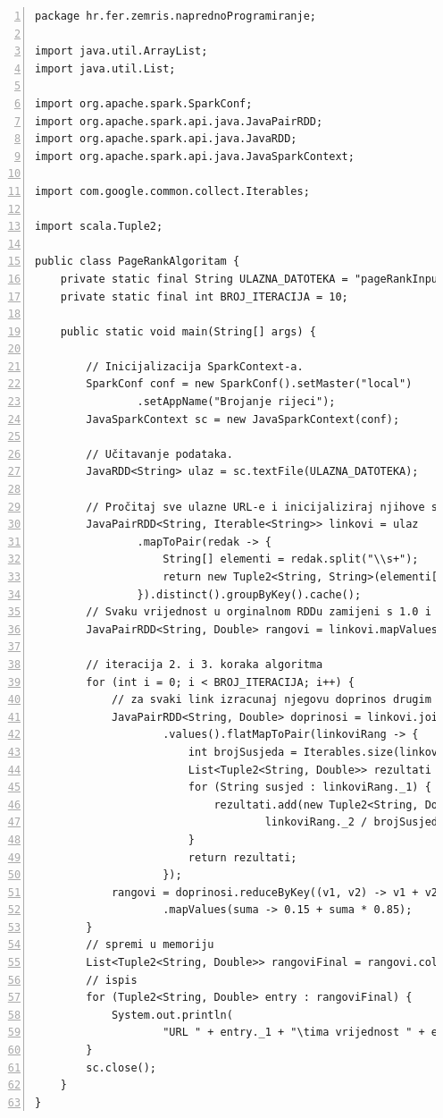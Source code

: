 \documentclass[times, utf8, zavrsni]{fer}
\begin{document}
\vspace{5mm}
\begin{lstlisting}[numbers=left, label={lst:pagerank}]
package hr.fer.zemris.naprednoProgramiranje;

import java.util.ArrayList;
import java.util.List;

import org.apache.spark.SparkConf;
import org.apache.spark.api.java.JavaPairRDD;
import org.apache.spark.api.java.JavaRDD;
import org.apache.spark.api.java.JavaSparkContext;

import com.google.common.collect.Iterables;

import scala.Tuple2;

public class PageRankAlgoritam {
	private static final String ULAZNA_DATOTEKA = "pageRankInput.txt";
	private static final int BROJ_ITERACIJA = 10;

	public static void main(String[] args) {

		// Inicijalizacija SparkContext-a.
		SparkConf conf = new SparkConf().setMaster("local")
				.setAppName("Brojanje rijeci");
		JavaSparkContext sc = new JavaSparkContext(conf);

		// Učitavanje podataka.
		JavaRDD<String> ulaz = sc.textFile(ULAZNA_DATOTEKA);

		// Pročitaj sve ulazne URL-e i inicijaliziraj njihove susjede.
		JavaPairRDD<String, Iterable<String>> linkovi = ulaz
				.mapToPair(redak -> {
					String[] elementi = redak.split("\\s+");
					return new Tuple2<String, String>(elementi[0], elementi[1]);
				}).distinct().groupByKey().cache();
		// Svaku vrijednost u orginalnom RDDu zamijeni s 1.0 i vrati novi RDD.
		JavaPairRDD<String, Double> rangovi = linkovi.mapValues(value -> 1.0);

		// iteracija 2. i 3. koraka algoritma
		for (int i = 0; i < BROJ_ITERACIJA; i++) {
			// za svaki link izracunaj njegovu doprinos drugim linkovima
			JavaPairRDD<String, Double> doprinosi = linkovi.join(rangovi)
					.values().flatMapToPair(linkoviRang -> {
						int brojSusjeda = Iterables.size(linkoviRang._1);
						List<Tuple2<String, Double>> rezultati = new ArrayList<Tuple2<String, Double>>();
						for (String susjed : linkoviRang._1) {
							rezultati.add(new Tuple2<String, Double>(susjed,
									linkoviRang._2 / brojSusjeda));
						}
						return rezultati;
					});
			rangovi = doprinosi.reduceByKey((v1, v2) -> v1 + v2)
					.mapValues(suma -> 0.15 + suma * 0.85);
		}
		// spremi u memoriju
		List<Tuple2<String, Double>> rangoviFinal = rangovi.collect();
		// ispis
		for (Tuple2<String, Double> entry : rangoviFinal) {
			System.out.println(
					"URL " + entry._1 + "\tima vrijednost " + entry._2);
		}
		sc.close();
	}
}
\end{lstlisting}
\vspace{5mm}
\end{document}
